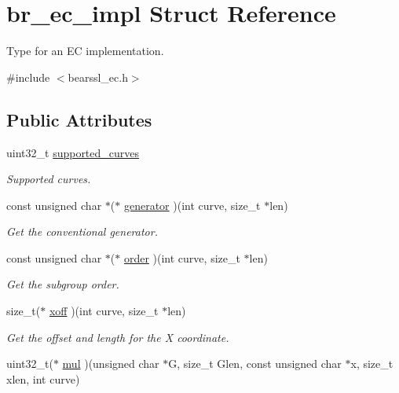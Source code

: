 \hypertarget{structbr__ec__impl}{}\section{br\+\_\+ec\+\_\+impl Struct Reference}
\label{structbr__ec__impl}


Type for an EC implementation.  




{\ttfamily \#include $<$bearssl\+\_\+ec.\+h$>$}

\subsection*{Public Attributes}
\begin{DoxyCompactItemize}
\item 
uint32\+\_\+t \hyperlink{structbr__ec__impl_ab69ca9dac77a15e383b4f87aa9bca444}{supported\+\_\+curves}
\begin{DoxyCompactList}\small\item\em Supported curves. \end{DoxyCompactList}\item 
const unsigned char $\ast$($\ast$ \hyperlink{structbr__ec__impl_aefb8a81a4434ba81fd669874d9bc6ab8}{generator} )(int curve, size\+\_\+t $\ast$len)
\begin{DoxyCompactList}\small\item\em Get the conventional generator. \end{DoxyCompactList}\item 
const unsigned char $\ast$($\ast$ \hyperlink{structbr__ec__impl_a41234ee4172eadd1c59b5f5ef5540b81}{order} )(int curve, size\+\_\+t $\ast$len)
\begin{DoxyCompactList}\small\item\em Get the subgroup order. \end{DoxyCompactList}\item 
size\+\_\+t($\ast$ \hyperlink{structbr__ec__impl_a8b786258f39d2d26e03e96dec95a6d23}{xoff} )(int curve, size\+\_\+t $\ast$len)
\begin{DoxyCompactList}\small\item\em Get the offset and length for the X coordinate. \end{DoxyCompactList}\item 
uint32\+\_\+t($\ast$ \hyperlink{structbr__ec__impl_abc4f4ce448754b7f93632a284bfe4b3d}{mul} )(unsigned char $\ast$G, size\+\_\+t Glen, const unsigned char $\ast$x, size\+\_\+t xlen, int curve)

\end{DoxyCompactItemize}
